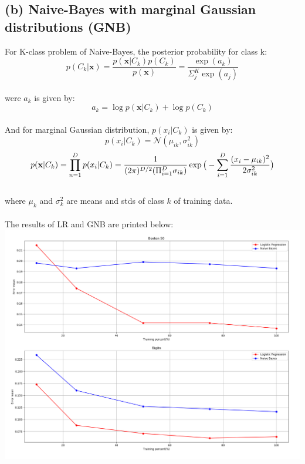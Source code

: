 \documentclass[a4paper]{article}
\begin{document}
\subsection{(b) Naive-Bayes with marginal Gaussian distributions (GNB)}
For K-class problem of Naive-Bayes, the posterior probability for class k:
$$p(C_{k}|\mathbf{x})=\frac{p(\mathbf{x}|C_{k})p(C_{k})}{p(\mathbf{x})}=\frac{\exp(a_{k})}{\Sigma_{j}^{K}\exp(a_{j})}$$\\
were $a_{k}$ is given by:\\
$$a_{k}=\log p(\mathbf{x}|C_{k})+\log p(C_{k})$$\\
And for marginal Gaussian distribution, $p(x_{i}|C_{k})$ is given by:\\
$$p(x_{i}|C_{k})=\mathcal{N}(\mu_{ik}, \sigma_{ik}^{2})$$
$$p(\mathbf{x}|C_{k})=\prod_{n=1}^D p(x_{i}|C_{k})=\frac{1}{(2\pi)^{D/2}(\Pi_{i=1}^{D}\sigma_{ik})}\\
\exp \big(-\sum_{i=1}^{D}\frac{(x_{i}-\mu_{ik})^{2}}{2\sigma_{ik}^{2}}\big)$$\\
where $\mu_{k}$ and $\sigma_{k}^{2}$ are means and stds of class $k$ of training data.\\
\\
The results of LR and GNB are printed below:\\
\includegraphics[width=\textwidth]{q4.png}\\
\end{document}

